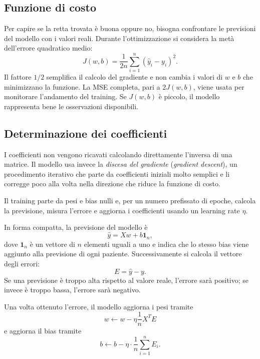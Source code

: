 \subsection{Funzione di costo}
Per capire se la retta trovata \`e buona oppure no, bisogna confrontare le previsioni del modello con i valori reali. Durante l'ottimizzazione si considera la met\`a dell'errore quadratico medio:
\begin{equation}
J(w,b) = \frac{1}{2n}\sum_{i=1}^{n}(\hat{y}_i - y_i)^2.
\end{equation}
Il fattore $1/2$ semplifica il calcolo del gradiente e non cambia i valori di $w$ e $b$ che minimizzano la funzione. La MSE completa, pari a $2J(w,b)$, viene usata per monitorare l'andamento del training. Se $J(w,b)$ \`e piccolo, il modello rappresenta bene le osservazioni disponibili.

\subsection{Determinazione dei coefficienti}
I coefficienti non vengono ricavati calcolando direttamente l'inversa di una matrice. Il modello usa invece la \emph{discesa del gradiente} (\emph{gradient descent}), un procedimento iterativo che parte da coefficienti iniziali molto semplici e li corregge poco alla volta nella direzione che riduce la funzione di costo.

Il training parte da pesi e bias nulli e, per un numero prefissato di epoche, calcola la previsione, misura l'errore e aggiorna i coefficienti usando un learning rate $\eta$.

In forma compatta, la previsione del modello \`e
\begin{equation}
\hat{y} = Xw + b\mathbf{1}_n,
\end{equation}
 dove $\mathbf{1}_n$ \`e un vettore di $n$ elementi uguali a uno e indica che lo stesso bias viene aggiunto alla previsione di ogni paziente.
Successivamente si calcola il vettore degli errori:
\begin{equation}
E = \hat{y} - y.
\end{equation}
Se una previsione \`e troppo alta rispetto al valore reale, l'errore sar\`a positivo; se invece \`e troppo bassa, l'errore sar\`a negativo.

Una volta ottenuto l'errore, il modello aggiorna i pesi tramite
\begin{equation}
w \leftarrow w - \eta \frac{1}{n} X^T E
\end{equation}
e aggiorna il bias tramite
\begin{equation}
b \leftarrow b - \eta \cdot \frac{1}{n}\sum_{i=1}^{n} E_i.
\end{equation}

